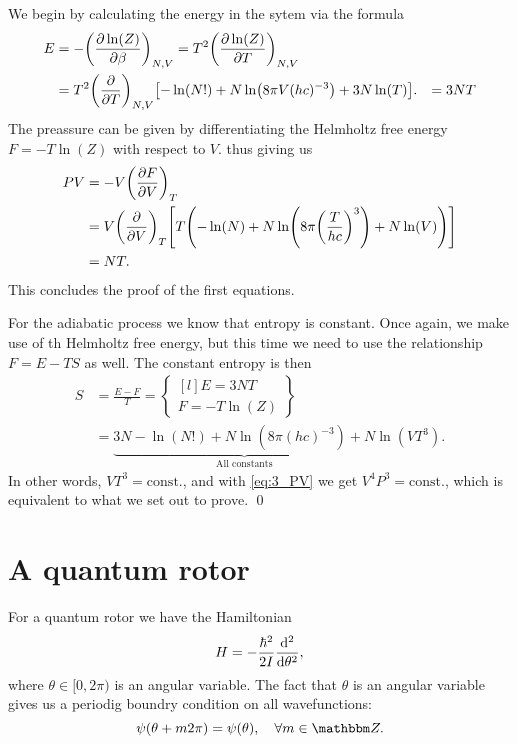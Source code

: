 \documentclass[11pt,letter, swedish, english
]{article}
\begin{document}
We begin by calculating the energy in the sytem via the formula
\begin{equation}\label{eq:3_E}
\begin{aligned}
E&=-\qty(\pdv{\ln(Z)}{\beta})_{N,V}=T^2\qty(\pdv{\ln(Z)}{T})_{N,V}\\
&=T^2\qty(\pdv{T})_{N,V}\qty[-\ln(N!)+N\ln(8\pi V (hc)^{-3})+3N\ln(T)].
&=3NT
\end{aligned}
\end{equation}
The preassure can be given by differentiating the Helmholtz free energy
$F=-T\ln(Z)$ with respect to $V$.
thus giving us
\begin{equation}\label{eq:3_PV}
\begin{aligned}
PV&=-V\qty(\pdv{F}{V})_{T}\\
&=V\qty(\pdv{V})_{T}
\qty[T\qty(-\ln(N)+N\ln(8\pi\qty(\frac{T}{hc})^3) + N\ln(V))]\\
&=NT.
\end{aligned}
\end{equation}
This concludes the proof of the first equations.

For the adiabatic process we know that entropy is constant. Once again,
we make use of th Helmholtz free energy, but this time we need to use
the relationship $F=E-TS$ as well. The constant entropy is then
\begin{equation}
\begin{aligned}
S&=\frac{E-F}{T}=\begin{Bmatrix*}[l]
E=3NT\\F=-T\ln(Z)
\end{Bmatrix*}\\
&=\underbrace{3N-\ln(N!) +N\ln(8\pi(hc)^{-3})+N}_\text{All constants}
\ln(VT^3).
\end{aligned}
\end{equation}
In other words, $VT^3=\text{const.}$, and with \eqref{eq:3_PV} we get
$V^4P^3=\text{const.}$, which is equivalent to what we set out to
prove. 
\qed


\section{A quantum rotor}
For a quantum rotor we have the Hamiltonian
\begin{equation}
H = -\frac{\hbar^2}{2I} \dv[2]{\theta},
\end{equation}
where $\theta\in[0,2\pi)$ is an angular variable. The fact that
$\theta$ is an angular variable gives us a periodig boundry condition
on all wavefunctions:
\begin{equation}
\psi(\theta+m2\pi)=\psi(\theta)\qcomma \forall m\in\Z.
\end{equation}
\end{document}
